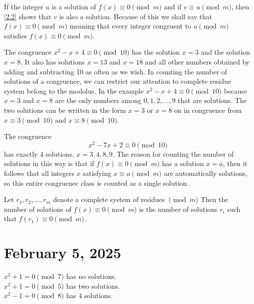 \documentclass[11pt]{article}
\begin{document}
If the integer \(u\) is a solution of \(f(x) \equiv 0 \pmod{m}\) and if \(v
\equiv u \pmod{m}\), then \cref{2.2} shows that \(v\) is also a solution.
Because of this we shall say that \(f(x) \equiv 0 \pmod{m}\) meaning that every
integer congruent to \(u \pmod{m}\) satisfies \(f(x) \equiv 0 \pmod{m}\).
\begin{example}
    The congruence \(x^2 - x + 4 \equiv 0 \pmod{10}\) has the solution \(x = 3\) and the solution \(x = 8\). It also has solutions \(x = 13\) and \(x = 18\) and all other numbers obtained by adding and subtracting 10 as often as we wish. In counting the number of solutions of a congruence, we can restrict our attention to complete residue system belong to the modolus. In the example \(x^2 - x + 4 \equiv 0 \pmod{10}\) because \(x = 3\) and \(x = 8\) are the only numbers among \(0, 1, 2, \ldots, 9\) that are solutions. The two solutions can be written in the form \(x = 3\) or \(x = 8\) on in congruence from \(x \equiv 3 \pmod{10}\) and \(x \equiv 8 \pmod{10}\).
\end{example}

\begin{example}
    The congruence
    \[x^2 - 7x + 2 \equiv 0 \pmod{10}\]
    has exactly 4 solutions, \(x = 3, 4, 8, 9\). The reason for counting the number
    of solutions in this way is that if \(f(x) \equiv 0 \pmod{m}\) has a solution
    \(x = a\), then it follows that all integers \(x\) satisfying \(x \equiv a
    \pmod{m}\) are automatically solutions, so this entire congruenec class is
    counted as a single solution.
\end{example}

\begin{definition}
    Let \(r_1, r_2, \ldots, r_m\) denote a complete system of residues \(\pmod{m}\) Then the number of solutions of \(f(x) \equiv 0 \pmod{m}\) is the number of solutions \(r_i\) such that \(f(r_1) \equiv 0 \pmod{m}\).
\end{definition}

\section{February 5, 2025}
\begin{example}

    \(x^2 + 1 = 0 \pmod{7}\) has no solutions. \\
    \(x^2 + 1 = 0 \pmod{5}\) has two solutions. \\
    \(x^2 - 1 = 0 \pmod{8}\) has \(4\) solutions.

\end{example}
\end{document}
